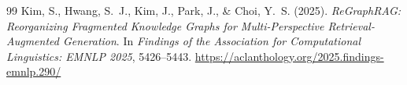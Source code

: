 \documentclass[12pt,a4paper]{report}
\theoremstyle{plain}
\theoremstyle{definition}
\begin{document}
\begin{thebibliography}{99}
		Kim, S., Hwang, S.~J., Kim, J., Park, J., \& Choi, Y.~S. (2025).
		\textit{ReGraphRAG: Reorganizing Fragmented Knowledge Graphs for
		Multi-Perspective Retrieval-Augmented Generation}.
		In \textit{Findings of the Association for Computational Linguistics: EMNLP 2025},
		5426--5443.
		\url{https://aclanthology.org/2025.findings-emnlp.290/}

		\end{thebibliography}
	
\end{document}

